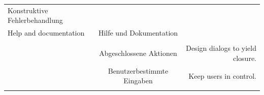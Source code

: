 \documentclass[
  12pt,
  ngerman,
  a4paper,
]{article}
\begin{document}
\begin{longtable}[]{@{}lcr@{}}
\begin{minipage}[t]{0.31\columnwidth}
Konstruktive Fehlerbehandlung\strut
\end{minipage} & \begin{minipage}[t]{0.30\columnwidth}\raggedleft
\strut
\end{minipage}\tabularnewline
\begin{minipage}[t]{0.30\columnwidth}\raggedright
Help and documentation\strut
\end{minipage} & \begin{minipage}[t]{0.31\columnwidth}\centering
Hilfe und Dokumentation\strut
\end{minipage} & \begin{minipage}[t]{0.30\columnwidth}\raggedleft
\strut
\end{minipage}\tabularnewline
\begin{minipage}[t]{0.30\columnwidth}\raggedright
\strut
\end{minipage} & \begin{minipage}[t]{0.31\columnwidth}\centering
\strut
\end{minipage} & \begin{minipage}[t]{0.30\columnwidth}\raggedleft
\strut
\end{minipage}\tabularnewline
\begin{minipage}[t]{0.30\columnwidth}\raggedright
\strut
\end{minipage} & \begin{minipage}[t]{0.31\columnwidth}\centering
Abgeschlossene Aktionen\strut
\end{minipage} & \begin{minipage}[t]{0.30\columnwidth}\raggedleft
Design dialogs to yield closure.\strut
\end{minipage}\tabularnewline
\begin{minipage}[t]{0.30\columnwidth}\raggedright
\strut
\end{minipage} & \begin{minipage}[t]{0.31\columnwidth}\centering
Benutzerbestimmte Eingaben\strut
\end{minipage} & \begin{minipage}[t]{0.30\columnwidth}\raggedleft
Keep users in control.\strut
\end{minipage}\tabularnewline
\begin{minipage}[t]{0.30\columnwidth}\raggedright
\strut
\end{minipage} & \begin{minipage}[t]{0.31\columnwidth}\centering
\strut
\end{minipage} & \begin{minipage}[t]{0.30\columnwidth}\raggedleft

\end{minipage}
\end{longtable}
\end{document}
